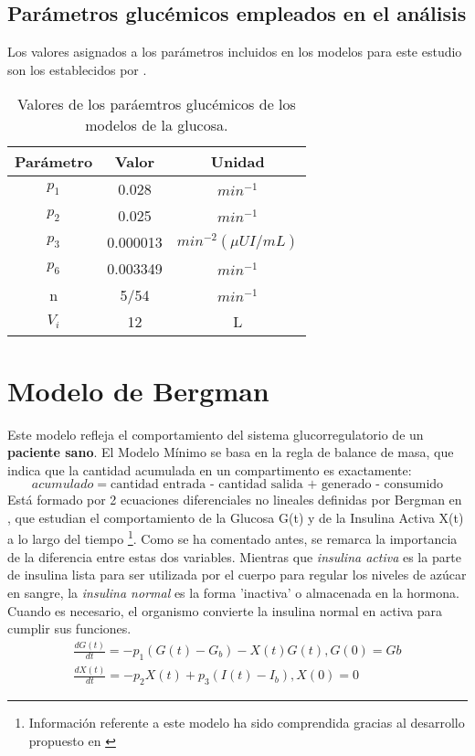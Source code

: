 \subsection{Parámetros glucémicos empleados en el análisis}

Los valores asignados a los parámetros incluidos en los modelos para este estudio son los establecidos por \cite{fisher1991semiclosed}.

\begin{table}[htbp]
    \centering
    \caption{Valores de los paráemtros glucémicos de los modelos de la glucosa.}
    \begin{tabular}{|c|c|c|}
        \hline
        Parámetro & Valor& Unidad \\
        \hline
        $p_1$ & 0.028 & $min^{-1}$ \\
        $p_2$ & 0.025 & $min^{-1}$ \\
        $p_3$ & 0.000013 &  $min^{-2} (\mu UI / mL)$\\
        $p_6$ & 0.003349 & $min^{-1}$ \\
        n & 5/54 & $min^{-1}$ \\
        $V_i$ & 12 & L \\
        \hline
    \end{tabular}
    \label{tab:parametros_glucemicos}
\end{table}

\section{Modelo de Bergman}

Este modelo refleja el comportamiento del sistema glucorregulatorio de un \textbf{paciente sano}. El Modelo Mínimo se basa en la regla de balance de masa, que indica que la cantidad acumulada en un compartimento es exactamente:
\begin{equation}
acumulado = \text{cantidad entrada - cantidad salida + generado - consumido}
\label{eq:balance_masas}
\end{equation}
 Está formado por 2 ecuaciones diferenciales no lineales definidas por Bergman en \cite{bergman1979quantitative}, que estudian el comportamiento de la Glucosa G(t) y de la Insulina Activa X(t) a lo largo del tiempo \footnote{Información referente a este modelo ha sido comprendida gracias al desarrollo propuesto en \cite{perez2017analisis}}.
 Como se ha comentado antes, se remarca la importancia de la diferencia entre estas dos variables. Mientras que \textit{insulina activa} es la parte de insulina lista para ser utilizada por el cuerpo para regular los niveles de azúcar en sangre, la \textit{insulina normal} es la forma 'inactiva' o almacenada en la hormona. Cuando es necesario, el organismo convierte la insulina normal en activa para cumplir sus funciones. 
\begin{align}
    \frac{dG(t)}{dt}= -p_1 (G(t) - G_b) - X(t)G(t) , G(0) = Gb
    \label{eq:ecBergGluc}\\
    \frac{dX(t)}{dt}= -p_2 X(t) + p_3(I(t) - I_b),    X(0) = 0
    \label{eq:ecBergInsAc}
\end{align}

